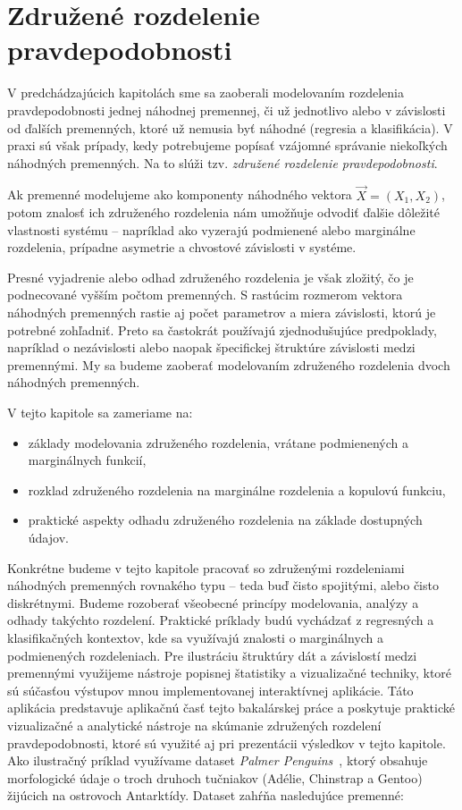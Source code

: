 \chapter{Združené rozdelenie pravdepodobnosti}\label{sec:joint_dist}

V predchádzajúcich kapitolách sme sa zaoberali modelovaním rozdelenia pravdepodobnosti jednej náhodnej premennej, či už jednotlivo alebo v závislosti od ďalších premenných, ktoré už nemusia byť náhodné (regresia a klasifikácia). V praxi sú však prípady, kedy potrebujeme popísať vzájomné správanie niekoľkých náhodných premenných. Na to slúži tzv. \textit{združené rozdelenie pravdepodobnosti}.

Ak premenné modelujeme ako komponenty náhodného vektora $\vec{X} = (X_1, X_2)$, potom znalosť ich združeného rozdelenia nám umožňuje odvodiť ďalšie dôležité vlastnosti systému – napríklad ako vyzerajú podmienené alebo marginálne rozdelenia, prípadne  asymetrie a chvostové závislosti v systéme.

Presné vyjadrenie alebo odhad združeného rozdelenia je však zložitý, čo je podnecované vyšším počtom premenných. S rastúcim rozmerom vektora náhodných premenných rastie aj počet parametrov a miera závislosti, ktorú je potrebné zohľadniť. Preto sa častokrát používajú zjednodušujúce predpoklady, napríklad o nezávislosti alebo naopak špecifickej štruktúre závislosti medzi premennými. My sa budeme zaoberať modelovaním združeného rozdelenia dvoch náhodných premenných.

V tejto kapitole sa zameriame na:
\begin{itemize}
  \item základy modelovania združeného rozdelenia, vrátane podmienených a marginálnych funkcií,
  \item rozklad združeného rozdelenia na marginálne rozdelenia a kopulovú funkciu,
  \item praktické aspekty odhadu združeného rozdelenia na základe dostupných údajov.
\end{itemize}

Konkrétne budeme v tejto kapitole pracovať so združenými rozdeleniami náhodných premenných rovnakého typu – teda buď čisto spojitými, alebo čisto diskrétnymi. Budeme rozoberať všeobecné princípy modelovania, analýzy a odhady takýchto rozdelení. Praktické príklady budú vychádzať z regresných a klasifikačných kontextov, kde sa využívajú znalosti o marginálnych a podmienených rozdeleniach. Pre ilustráciu štruktúry dát a závislostí medzi premennými využijeme nástroje popisnej štatistiky a vizualizačné techniky, ktoré sú súčasťou výstupov mnou implementovanej interaktívnej aplikácie. Táto aplikácia predstavuje aplikačnú časť tejto bakalárskej práce a poskytuje praktické vizualizačné a analytické nástroje na skúmanie združených rozdelení pravdepodobnosti, ktoré sú využité aj pri prezentácii výsledkov v tejto kapitole. Ako ilustračný príklad využívame dataset \textit{Palmer Penguins}~\parencite{horst2020palmerpenguins}, ktorý obsahuje morfologické údaje o troch druhoch tučniakov (Adélie, Chinstrap a Gentoo) žijúcich na ostrovoch Antarktídy. Dataset zahŕňa nasledujúce premenné:

